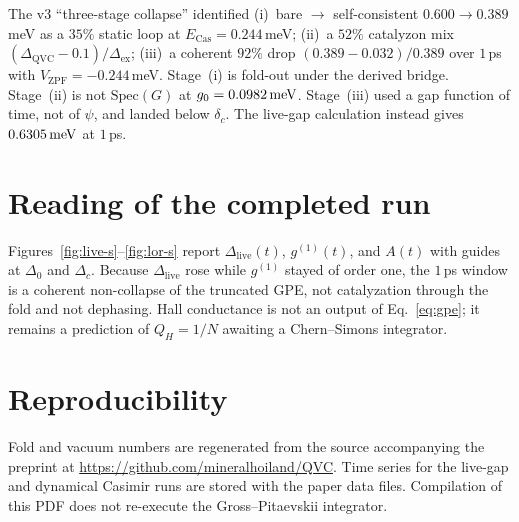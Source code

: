 \documentclass[11pt,letterpaper]{article}
\begin{document}
The v3 ``three-stage collapse'' identified (i)~bare $\to$ self-consistent $0.600\to 0.389$\,meV as a $35\%$ static loop at $E_{\mathrm{Cas}}=0.244$\,meV; (ii)~a $52\%$ catalyzon mix $(\Delta_{\mathrm{QVC}}-0.1)/\Delta_{\mathrm{ex}}$; (iii)~a coherent $92\%$ drop $(0.389-0.032)/0.389$ over $1$\,ps with $V_{\mathrm{ZPF}}=-0.244$\,meV. Stage~(i) is fold-out under the derived bridge. Stage~(ii) is not $\mathrm{Spec}(G)$ at $g_0=0.0982\,\mathrm{meV}$. Stage~(iii) used a gap function of time, not of $\psi$, and landed below $\delta_c$. The live-gap calculation instead gives $0.6305\,\mathrm{meV}$ at $1$\,ps.

\section{Reading of the completed run}
\label{sec:readout}

Figures~\ref{fig:live-s}--\ref{fig:lor-s} report $\Delta_{\mathrm{live}}(t)$, $g^{(1)}(t)$, and $A(t)$ with guides at $\Delta_0$ and $\Delta_c$. Because $\Delta_{\mathrm{live}}$ rose while $g^{(1)}$ stayed of order one, the $1$\,ps window is a coherent non-collapse of the truncated GPE, not catalyzation through the fold and not dephasing. Hall conductance is not an output of Eq.~\eqref{eq:gpe}; it remains a prediction of $Q_H=1/N$ awaiting a Chern--Simons integrator.

\section{Reproducibility}
\label{sec:repro}

Fold and vacuum numbers are regenerated from the source accompanying the preprint at \url{https://github.com/mineralhoiland/QVC}. Time series for the live-gap and dynamical Casimir runs are stored with the paper data files. Compilation of this PDF does not re-execute the Gross--Pitaevskii integrator.



\end{document}
